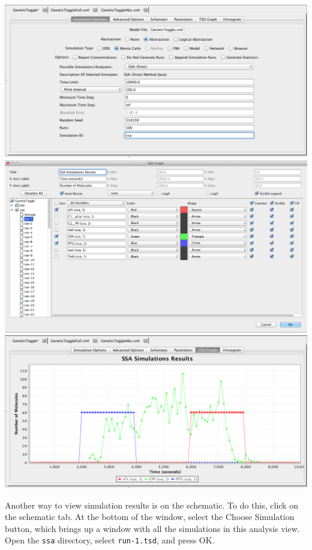 \documentclass[titlepage,11pt]{article}
\begin{document}
\begin{center}
\includegraphics[width=160mm]{screenshots/ssaSimGT}\\
\includegraphics[width=160mm]{screenshots/ssaResultsGT}\\
\includegraphics[width=160mm]{screenshots/ssaSimResultsGT}
\end{center}

Another way to view simulation results is on the schematic.  To do this, click on the schematic tab.  At the bottom of the window, select the Choose Simulation button, which brings up a window with all the simulations in this analysis view.  Open the {\tt ssa} directory, select {\tt run-1.tsd}, and press OK. 
\end{document}
